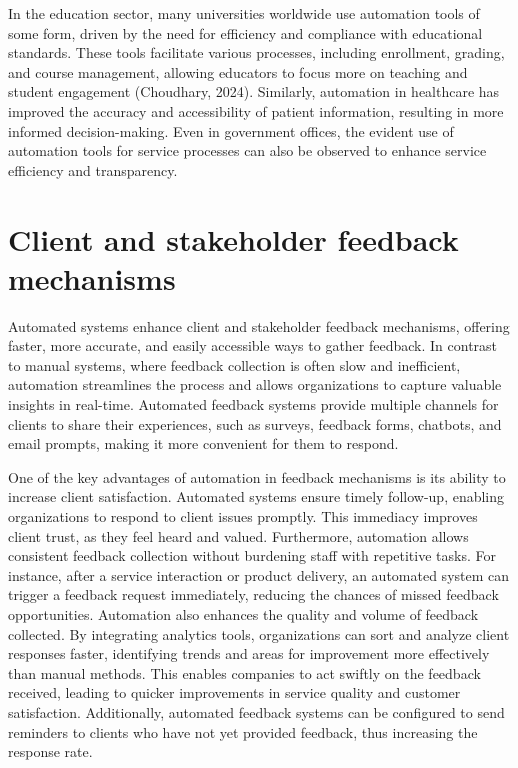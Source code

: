 In the education sector, many universities worldwide use automation tools of some form, driven by the need for efficiency and compliance with educational standards. These tools facilitate various processes, including enrollment, grading, and course management, allowing educators to focus more on teaching and student engagement (Choudhary, 2024). Similarly, automation in healthcare has improved the accuracy and accessibility of patient information, resulting in more informed decision-making. Even in government offices, the evident use of automation tools for service processes can also be observed to enhance service efficiency and transparency. 


\section{Client and stakeholder feedback mechanisms}

Automated systems enhance client and stakeholder feedback mechanisms, offering faster, more accurate, and easily accessible ways to gather feedback. In contrast to manual systems, where feedback collection is often slow and inefficient, automation streamlines the process and allows organizations to capture valuable insights in real-time. Automated feedback systems provide multiple channels for clients to share their experiences, such as surveys, feedback forms, chatbots, and email prompts, making it more convenient for them to respond.

One of the key advantages of automation in feedback mechanisms is its ability to increase client satisfaction. Automated systems ensure timely follow-up, enabling organizations to respond to client issues promptly. This immediacy improves client trust, as they feel heard and valued. Furthermore, automation allows consistent feedback collection without burdening staff with repetitive tasks. For instance, after a service interaction or product delivery, an automated system can trigger a feedback request immediately, reducing the chances of missed feedback opportunities.
Automation also enhances the quality and volume of feedback collected. By integrating analytics tools, organizations can sort and analyze client responses faster, identifying trends and areas for improvement more effectively than manual methods. This enables companies to act swiftly on the feedback received, leading to quicker improvements in service quality and customer satisfaction. Additionally, automated feedback systems can be configured to send reminders to clients who have not yet provided feedback, thus increasing the response rate.

